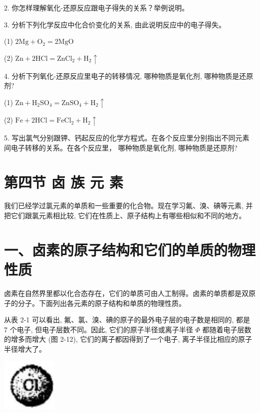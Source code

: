 \documentclass[10pt]{article}
\begin{document}
2. 你怎样理解氧化-还原反应跟电子得失的关系？举例说明。

3. 分析下列化学反应中化合价变化的关系, 由此说明反应中的电子得失。

(1) \(2\mathrm{{Mg}} + {\mathrm{O}}_{2} = 2\mathrm{{MgO}}\)

(2) \(\mathrm{{Zn}} + 2\mathrm{{HCl}} = {\mathrm{{ZnCl}}}_{2} + {\mathrm{H}}_{2} \uparrow\)

4. 分析下列氧化-还原反应里电子的转移情况, 哪种物质是氧化剂, 哪种物质是还原剂?

(1) \(\mathrm{{Zn}} + {\mathrm{H}}_{2}{\mathrm{{SO}}}_{4} = {\mathrm{{ZnSO}}}_{4} + {\mathrm{H}}_{2} \uparrow\)

(2) \(\mathrm{{Fe}} + 2\mathrm{{HCl}} = {\mathrm{{FeCl}}}_{2} + {\mathrm{H}}_{2} \uparrow\)

5. 写出氯气分别跟钾、钙起反应的化学方程式。在各个反应里分别指出不同元素间电子转移的关系。在各个反应里， 哪种物质是氧化剂, 哪种物质是还原剂?

\section*{第四节 卤 族 元 素}

我们已经学过氯元素的单质和一些重要的化合物。现在学习氟、溴、碘等元素, 并把它们跟氯元素相比较, 它们在性质上、原子结构上有哪些相似和不同的地方。

\section*{一、卤素的原子结构和它们的单质的物理性质}

卤素在自然界里都以化合态存在，它们的单质可由人工制得。卤素的单质都是双原子的分子。下面列出各元素的原子结构和单质的物理性质。

从表 2-1 可以看出, 氟、氯、溴、碘的原子的最外电子层的电子数是相同的, 都是 7 个电子, 但电子层数不同。因此, 它们的原子半径或离子半径 \(\Phi\) 都随着电子层数的增多而增大 (图 2-12), 它们的离子都因得到了一个电子, 离子半径比相应的原子半径增大了。

\begin{center}
\includegraphics[max width=0.2\textwidth]{images/01912d0f-097c-7e75-8f32-4f326cd86c9f_47_783842.jpg}
\end{center}
\end{document}
